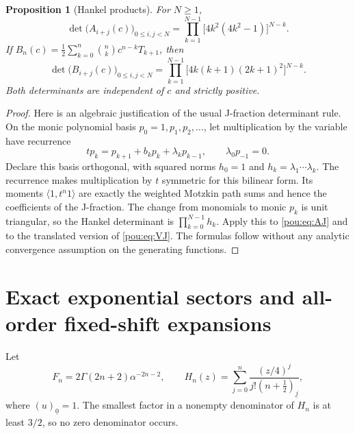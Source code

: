 \documentclass[11pt]{article}
\newtheorem{proposition}[theorem]{Proposition}
\theoremstyle{definition}
\theoremstyle{remark}
\newcommand{\fall}[2]{(#1)_{\underline{#2}}}
\begin{document}
\begin{proposition}[Hankel products]\label{pou:prop:hankel}
For $N\ge1$,
\begin{equation}\label{pou:eq:hankelA}
 \det\bigl(A_{i+j}(c)\bigr)_{0\le i,j<N}
 =\prod_{k=1}^{N-1}\bigl[4k^2(4k^2-1)\bigr]^{N-k}.
\end{equation}
If
$B_n(c)=\frac12\sum_{k=0}^n\binom nk c^{n-k}T_{k+1}$, then
\begin{equation}\label{pou:eq:hankelB}
 \det\bigl(B_{i+j}(c)\bigr)_{0\le i,j<N}
 =\prod_{k=1}^{N-1}\bigl[4k(k+1)(2k+1)^2\bigr]^{N-k}.
\end{equation}
Both determinants are independent of $c$ and strictly positive.
\end{proposition}
\begin{proof}
Here is an algebraic justification of the usual J-fraction determinant
rule.  On the monic polynomial basis $p_0=1,p_1,p_2,\ldots$, let
multiplication by the variable have recurrence
\[
 t p_k=p_{k+1}+b_kp_k+\lambda_kp_{k-1},\qquad \lambda_0p_{-1}=0.
\]
Declare this basis orthogonal, with squared norms
$h_0=1$ and $h_k=\lambda_1\cdots\lambda_k$.
The recurrence makes multiplication by $t$ symmetric for this bilinear
form.  Its moments $\langle1,t^n1\rangle$ are exactly the weighted Motzkin
path sums and hence the coefficients of the J-fraction.
The change from monomials to monic $p_k$ is unit triangular, so the Hankel
determinant is $\prod_{k=0}^{N-1}h_k$.
Apply this to \eqref{pou:eq:AJ} and to the translated version of
\eqref{pou:eq:VJ}.  The formulas follow without any analytic convergence
assumption on the generating functions.
\end{proof}

\section{Exact exponential sectors and all-order fixed-shift expansions}
\label{pou:sec:sectors}

Let
\begin{equation}\label{pou:eq:FandH}
 F_n=2\Gamma(2n+2)\alpha^{-2n-2},\qquad
 H_n(z)=\sum_{j=0}^n\frac{(z/4)^j}{j!\fall{n+\tfrac12}{j}},
\end{equation}
where $\fall u0=1$.  The smallest factor in a nonempty denominator of
$H_n$ is at least $3/2$, so no zero denominator occurs.
\end{document}
